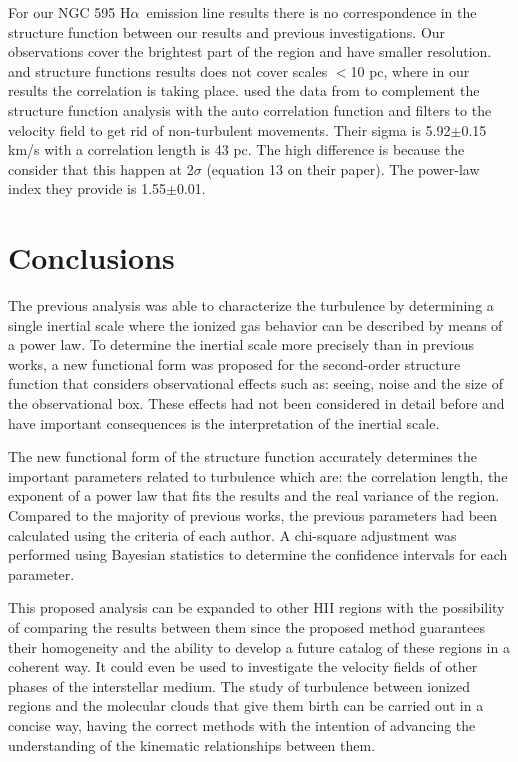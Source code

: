 \documentclass[fleqn,usenatbib, useAMS, a4paper]{mnras}
\newcommand\halpha{H${\alpha}$}
\begin{document}
For our NGC 595 \halpha\ emission line results there is no correspondence in the structure function between our results and previous investigations.
Our observations cover the brightest part of the region and have smaller resolution.
\citet{lagrois2009multi} and \citet{lagrois2011} structure functions results does not cover scales $<$10 pc, where in our results the correlation is taking place.
\citet{lagrois2011} used the data from \citet{lagrois2009multi} to complement the structure function analysis with the auto correlation function and filters to the velocity field to get rid of non-turbulent movements.
Their sigma is 5.92$\pm$0.15 km/s with a correlation length is 43 pc.
The high difference is because the consider that this happen at 2$\sigma$ (equation 13 on their paper).
The power-law index they provide is 1.55$\pm$0.01.


\section{Conclusions}\label{sec:conclusions}

The previous analysis was able to characterize the turbulence by determining a single inertial scale where the ionized gas behavior can be described by means of a power law.
To determine the inertial scale more precisely than in previous works, a new functional form was proposed for the second-order structure function that considers observational effects such as: seeing, noise and the size of the observational box.
These effects had not been considered in detail before and have important consequences is the interpretation of the inertial scale.

The new functional form of the structure function accurately determines the important parameters related to turbulence which are: the correlation length, the exponent of a power law that fits the results and the real variance of the region.
Compared to the majority of previous works, the previous parameters had been calculated using the criteria of each author.
A chi-square adjustment was performed using Bayesian statistics to determine the confidence intervals for each parameter.

This proposed analysis can be expanded to other HII regions with the possibility of comparing the results between them since the proposed method guarantees their homogeneity and the ability to develop a future catalog of these regions in a coherent way.
It could even be used to investigate the velocity fields of other phases of the interstellar medium.
The study of turbulence between ionized regions and the molecular clouds that give them birth can be carried out in a concise way, having the correct methods with the intention of advancing the understanding of the kinematic relationships between them.
\end{document}
